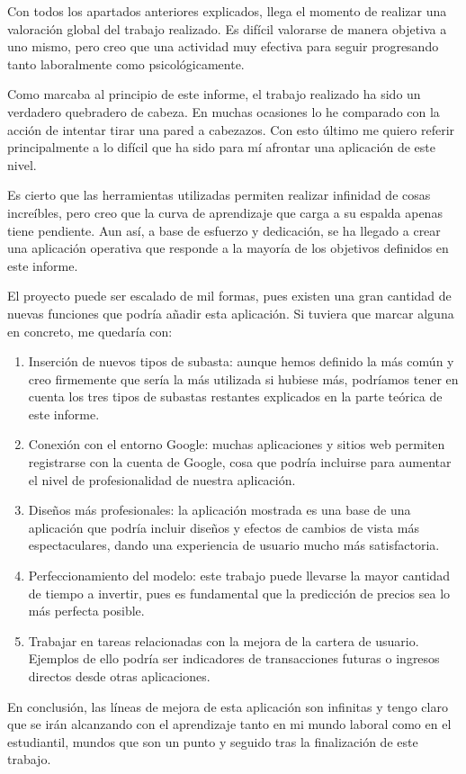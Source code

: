 

	Con todos los apartados anteriores explicados, llega el momento de realizar una valoración global del trabajo realizado. Es difícil valorarse de manera objetiva a uno mismo, pero creo que una actividad muy efectiva para seguir progresando tanto laboralmente como psicológicamente.
	
	Como marcaba al principio de este informe, el trabajo realizado ha sido un verdadero quebradero de cabeza. En muchas ocasiones lo he comparado con la acción de intentar tirar una pared a cabezazos. Con esto último me quiero referir principalmente a lo difícil que ha sido para mí afrontar una aplicación de este nivel.
	
	Es cierto que las herramientas utilizadas permiten realizar infinidad de cosas increíbles, pero creo que la curva de aprendizaje que carga a su espalda apenas tiene pendiente. Aun así, a base de esfuerzo y dedicación, se ha llegado a crear una aplicación operativa que responde a la mayoría de los objetivos definidos en este informe.
	
	El proyecto puede ser escalado de mil formas, pues existen una gran cantidad de nuevas funciones que podría añadir esta aplicación. Si tuviera que marcar alguna en concreto, me quedaría con:
	
	\begin{enumerate}
		\item Inserción de nuevos tipos de subasta: aunque hemos definido la más común y creo firmemente que sería la más utilizada si hubiese más, podríamos tener en cuenta los tres tipos de subastas restantes explicados en la parte teórica de este informe.
		\item Conexión con el entorno Google: muchas aplicaciones y sitios web permiten registrarse con la cuenta de Google, cosa que podría incluirse para aumentar el nivel de profesionalidad de nuestra aplicación.
		\item Diseños más profesionales: la aplicación mostrada es una base de una aplicación que podría incluir diseños y efectos de cambios de vista más espectaculares, dando una experiencia de usuario mucho más satisfactoria.
		\item Perfeccionamiento del modelo: este trabajo puede llevarse la mayor cantidad de tiempo a invertir, pues es fundamental que la predicción de precios sea lo más perfecta posible.
		\item Trabajar en tareas relacionadas con la mejora de la cartera de usuario. Ejemplos de ello podría ser indicadores de transacciones futuras o ingresos directos desde otras aplicaciones.
	\end{enumerate}
	
	En conclusión, las líneas de mejora de esta aplicación son infinitas y tengo claro que se irán alcanzando con el aprendizaje tanto en mi mundo laboral como en el estudiantil, mundos que son un punto y seguido tras la finalización de este trabajo.